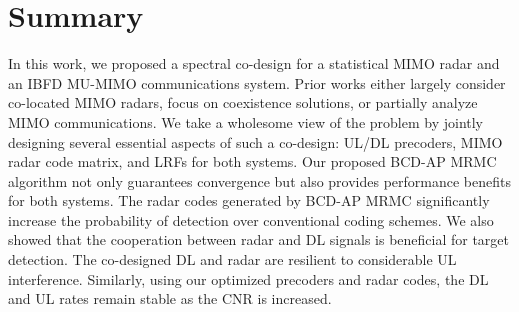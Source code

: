 \documentclass[10pt,journal]{IEEEtran}
\theoremstyle{definition}
\begin{document}
\section{Summary}
\label{sec:conclusion}
In this work, we proposed a spectral co-design for a statistical MIMO radar and an IBFD MU-MIMO communications system. Prior works either largely consider co-located MIMO radars, focus on coexistence solutions, or partially analyze MIMO communications. We take a wholesome view of the problem by jointly designing several essential aspects of such a co-design:  UL/DL precoders, MIMO radar code matrix, and LRFs for both systems. Our proposed BCD-AP MRMC algorithm not only guarantees convergence but also provides performance benefits for both systems. %
The radar codes generated by BCD-AP MRMC significantly increase the probability of detection over conventional coding schemes. We also showed that the cooperation between radar and DL signals is beneficial for target detection. The co-designed DL and radar are resilient to considerable UL interference. Similarly, using our optimized precoders and radar codes, the DL and UL rates remain stable as the CNR is increased. %
	
\end{document}
